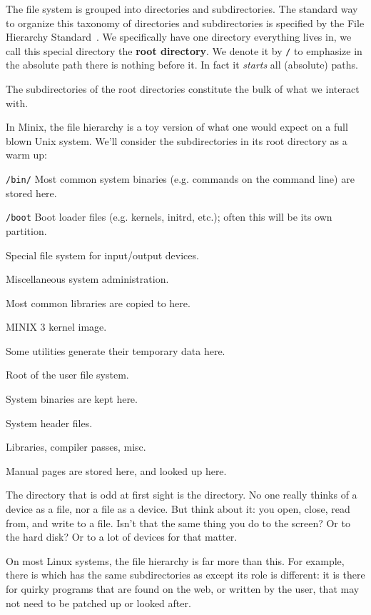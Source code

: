 
The file system is grouped into directories and
subdirectories. The standard way to organize this taxonomy of
directories and subdirectories is specified by the File Hierarchy
Standard~\cite{fhs}. We specifically have one directory
everything lives in, we call this special directory the
\textbf{root directory}. We denote it by \texttt{/} to emphasize
in the absolute path there is nothing before it. In fact it
\emph{starts} all (absolute) paths.

The subdirectories of the root directories constitute the bulk of
what we interact with.

In Minix, the file hierarchy is a toy version of what one would
expect on a full blown Unix system. We'll consider the
subdirectories in its root directory as a warm up:
\begin{list}{\quad}{}
\item[{\tt/bin/}] Most common system binaries (e.g. commands on the
  command line) are stored here.
\item[{\tt/boot}] Boot loader files (e.g. kernels, initrd,
  etc.); often this will be its own partition.
\item[\courier{/dev/}] Special file system for input/output devices.
\item[\courier{/etc/}] Miscellaneous system administration.
\item[\courier{/lib/}] Most common libraries are copied to here.
\item[\courier{/minix}] MINIX 3 kernel image.
\item[\courier{/tmp/}] Some utilities generate their temporary data here.
\item[\courier{/usr/}] Root of the user file system.
\item[\courier{/usr/bin}] System binaries are kept here.
\item[\courier{/usr/include}] System header files.
\item[\courier{/usr/lib}] Libraries, compiler passes, misc.
\item[\courier{/usr/man}] Manual pages are stored here, and looked up here.
\end{list}
The directory that is odd at first sight is the 
directory. No one really thinks of a device as a file, nor a file
as a device. But think about it: you open, close, read from, and
write to a file. Isn't that the same thing you do to the screen?
Or to the hard disk? Or to a lot of devices for that matter.

On most Linux systems, the file hierarchy is far more than
this. For example, there is  which has the
same subdirectories as  except its role is
different: it is there for quirky programs that are found on the
web, or written by the user, that may not need to be patched up
or looked after.
